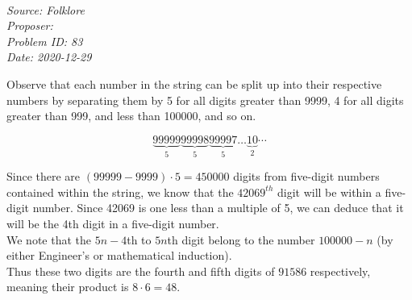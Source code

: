 \SSbreak\\
\emph{Source: Folklore}\\
\emph{Proposer: \Pss}\\
\emph{Problem ID: 83}\\
\emph{Date: 2020-12-29}\\
\SSbreak

\bigskip

\begin{solution}\hfil\medskip

Observe that each number in the string can be split up into their respective numbers by separating them by 5 for all digits greater than 9999, 4 for all digits greater than 999, and less than 100000, and so on. 

\begin{equation*}
  \underbrace{99999}_{5}\underbrace{99998}_{5}\underbrace{99997}_{5}\ldots\underbrace{10}_2\cdots
\end{equation*}

Since there are \((99999-9999)\cdot5=450000\) digits from five-digit numbers contained within the string, we know that the \(42069^{th}\) digit will be within a five-digit number. Since 42069 is one less than a multiple of 5, we can deduce that it will be the 4th digit in a five-digit number. \\
We note that the \(5n-4\)th to \(5n\)th digit belong to the number \(100000-n\) (by either Engineer's or mathematical induction). \\
Thus these two digits are the fourth and fifth digits of \(91586\) respectively, meaning their product is \(8 \cdot 6 = \boxed{48}\). 
\end{solution}\bigskip
